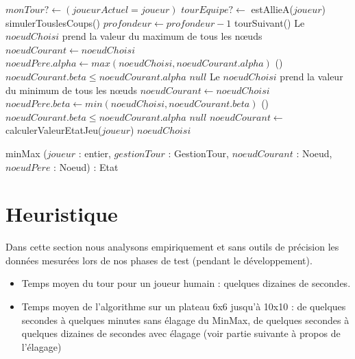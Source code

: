 \documentclass[11pt,a4paper]{article}
\begin{document}
\begin{algorithm}[H]
$monTour? \gets (joueurActuel = joueur)$\;
$tourEquipe? \gets $ estAllieA($joueur$)\;
simulerTouslesCoups()\;
$profondeur \gets profondeur-1$\;
tourSuivant()\;
 {
     {
    Le $noeudChoisi$ prend la valeur du maximum de tous les nœuds\;
    $noeudCourant \gets noeudChoisi$\;
         {
        $noeudPere.alpha \gets max(noeudChoisi,noeudCourant.alpha)$\;
        }
        \Si(){$noeudCourant.beta \le noeudCourant.alpha$} { 
        \Kwrenv $null$\;
        }
    }
    {
     Le $noeudChoisi$ prend la valeur du minimum de tous les nœuds\;
    $noeudCourant \gets noeudChoisi$\;
     {
        $noeudPere.beta \gets min(noeudChoisi,noeudCourant.beta)$\;
        }
    \Si(){$noeudCourant.beta \le noeudCourant.alpha$} {
    \Kwrenv $null$\;
    }}
}
{$noeudCourant \gets $ calculerValeurEtatJeu($joueur$)\;}
\Kwrenv $noeudChoisi$\;
\caption{minMax ($joueur$ : entier, $gestionTour$ : GestionTour, $noeudCourant$ : Noeud, $noeudPere$ : Noeud) : Etat}

\label{algo:max}
\end{algorithm}

\vspace{20px}

\section{Heuristique}

Dans cette section nous analysons empiriquement et sans outils de précision les données mesurées lors de nos phases de test (pendant le développement).
\begin{itemize}
    \item Temps moyen du tour pour un joueur humain : quelques dizaines de secondes.
    \item Temps moyen de l'algorithme sur un plateau 6x6 jusqu'à 10x10 : de quelques secondes à quelques minutes sans élagage du MinMax, de quelques secondes à quelques dizaines de secondes avec élagage (voir partie suivante à propos de l'élagage)
\end{itemize}
\end{document}
